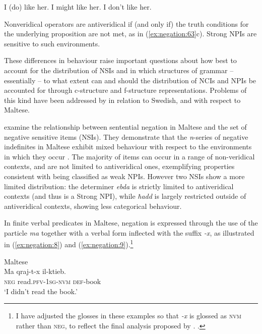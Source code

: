 \documentclass[output=paper,hidelinks]{langscibook}
\begin{document}
\ea\label{ex:negation:63}
\ea\label{ex:negation:63a} I (do) like her.
\ex\label{ex:negation:63b} I might like her.
\ex\label{ex:negation:63c} I don't like her.
\z\z

Nonveridical operators are antiveridical if (and only if) the truth conditions for the underlying proposition are not met, as in (\ref{ex:negation:63}c). Strong NPIs are sensitive to such environments. 

These differences in behaviour raise important questions about how best to account for the distribution of NSIs and in which structures of grammar -- essentially -- to what extent can and should the distribution of NCIs and NPIs be accounted for through c-structure and f-structure representations. Problems of this kind have been addressed by \citet{sellsneg} in relation to Swedish, and \citet{camilleri-sadler:2017} with respect to Maltese.

\citet{camilleri-sadler:2017} examine the relationship between sentential negation in Maltese and the set of negative sensitive items (\textsc{NSI}s). They demonstrate that the \emph{n}-series of negative indefinites in Maltese exhibit mixed behaviour with respect to the environments in which they occur \citep [154--156] {camilleri-sadler:2017}. The majority of items can occur in a range of non-veridical contexts, and are not limited to antiveridical ones, exemplifying properties consistent with being classified as weak NPIs. However two NSIs show a more limited distribution: the determiner \emph{ebda} is strictly limited to antiveridical contexts (and thus is a Strong NPI), while \emph{ħadd} is largely restricted outside of antiveridical contexts, showing less categorical behaviour.

In finite verbal predicates in Maltese, negation is expressed through the use of the particle \emph{ma} together with a verbal form inflected with the suffix \emph{-x}, as illustrated in (\ref{ex:negation:8}) and (\ref{ex:negation:9}).\footnote{I have adjusted the glosses in these examples so that \emph{-x} is glossed as \textsc{nvm} rather than \textsc{neg}, to reflect the final analysis proposed by \citet {camilleri-sadler:2017}. .}

\ea\label{ex:negation:8}Maltese \citep [147]{camilleri-sadler:2017}\\
\gll Ma qraj-t-x il-ktieb.\\  
    \textsc{neg} read.\textsc{pfv-1sg-nvm} \textsc{def}-book\\ 
\glt `I didn't read the book.'
\z
\end{document}
